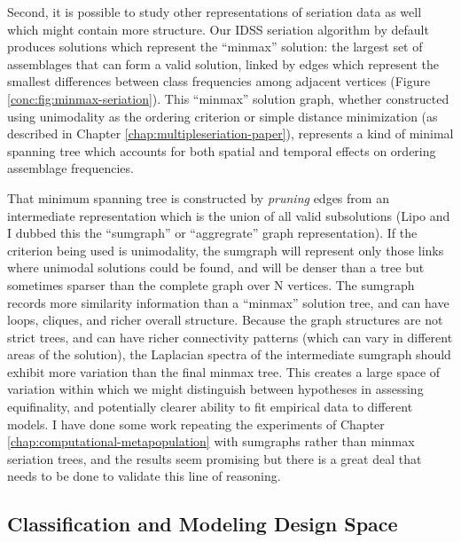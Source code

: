 Second, it is possible to study other representations of seriation data as well which might contain more structure.  Our IDSS seriation algorithm \citep{Lipo2015} by default produces solutions which represent the ``minmax'' solution:  the largest set of assemblages that can form a valid solution, linked by edges which represent the smallest differences between class frequencies among adjacent vertices (Figure \ref{conc:fig:minmax-seriation}).  This ``minmax'' solution graph, whether constructed using unimodality as the ordering criterion or simple distance minimization (as described in Chapter \ref{chap:multipleseriation-paper}), represents a kind of minimal spanning tree which accounts for both spatial and temporal effects on ordering assemblage frequencies.  

That minimum spanning tree is constructed by \emph{pruning} edges from an intermediate representation which is the union of all valid subsolutions (Lipo and I dubbed this the ``sumgraph'' or ``aggregrate'' graph representation).  If the criterion being used is unimodality, the sumgraph will represent only those links where unimodal solutions could be found, and will be denser than a tree but sometimes sparser than the complete graph over N vertices.  The sumgraph records more similarity information than a ``minmax'' solution tree, and can have loops, cliques, and richer overall structure.  Because the graph structures are not strict trees, and can have richer connectivity patterns (which can vary in different areas of the solution), the Laplacian spectra of the intermediate sumgraph should exhibit more variation than the final minmax tree.  This creates a large space of variation within which we might distinguish between hypotheses in assessing equifinality, and potentially clearer ability to fit empirical data to different models.  I have done some work repeating the experiments of Chapter \ref{chap:computational-metapopulation} with sumgraphs rather than minmax seriation trees, and the results seem promising but there is a great deal that needs to be done to validate this line of reasoning.  

\subsection{Classification and Modeling Design Space}\label{conc:sec:future-design-space}

